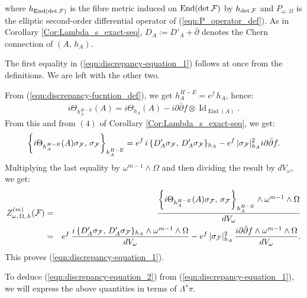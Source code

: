 \documentclass[12pt]{article}
\begin{document}
\begin{The-Def}
\noindent where $h_{\operatorname{End}({\det\cal F})}$ is the fibre metric induced on $\operatorname{End}({\det\cal F})$ by $h_{\det\cal F}$ and $P_{\omega,\,\Omega}$ is the elliptic second-order differential operator of (\ref{eqn:P_operator_def}). As in Corollary \ref{Cor:Lambda_s_exact-seq}, $D_A:=D'_A + \bar\partial$ denotes the Chern connection of $(A,\,h_A)$. 

\end{The-Def} 

 The first equality in (\ref{eqn:discrepancy-equation_1}) follows at once from the definitions. We are left with the other two.

From (\ref{eqn:discrepancy-fucntion_def}), we get $h_A^{H-E} = e^f\,h_A$, hence:  \begin{eqnarray*}i\Theta_{h_A^{H-E}}(A) = i\Theta_{h_A}(A) - i\partial\bar\partial f\otimes\operatorname{Id}_{\operatorname{End}(A)}.\end{eqnarray*} From this and from $(4)$ of Corollary \ref{Cor:Lambda_s_exact-seq}, we get: \begin{eqnarray*}\bigg\{i\Theta_{h_A^{H-E}}(A)\sigma_{\cal F},\,\sigma_{\cal F}\bigg\}_{h_A^{H-E}} = e^f\,i\,\{D'_A\sigma_{\cal F},\,D'_A\sigma_{\cal F}\}_{h_A} - e^f\,|\sigma_{\cal F}|^2_{h_A}i\partial\bar\partial f.\end{eqnarray*} Multiplying the last equality by $\omega^{m-1}\wedge\Omega$ and then dividing the result by $dV_\omega$, we get: \begin{eqnarray*}Z_{\omega,\,\Omega,\,h}^{(m)}({\cal F}) & = & \frac{\bigg\{i\Theta_{h_A^{H-E}}(A)\sigma_{\cal F},\,\sigma_{\cal F}\bigg\}_{h_A^{H-E}}\wedge\omega^{m-1}\wedge\Omega}{dV_\omega} \\
  & = & e^f\,\frac{i\,\{D'_A\sigma_{\cal F},\,D'_A\sigma_{\cal F}\}_{h_A}\wedge\omega^{m-1}\wedge\Omega}{dV_\omega} - e^f\,|\sigma_{\cal F}|^2_{h_A}\,\frac{i\partial\bar\partial f\wedge\omega^{m-1}\wedge\Omega}{dV_\omega}.\end{eqnarray*} This proves (\ref{eqn:discrepancy-equation_1}).

\vspace{1ex}

To deduce (\ref{eqn:discrepancy-equation_2}) from (\ref{eqn:discrepancy-equation_1}), we will express the above quantities in terms of $\Lambda^s\pi$.
\end{document}
